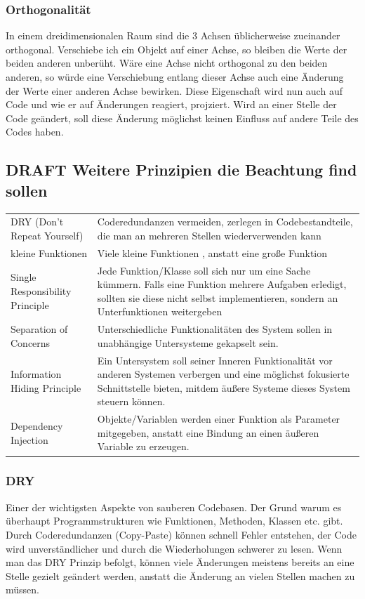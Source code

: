 \documentclass[11pt]{article}
\begin{document}
\subsubsection{Orthogonalität}
\label{sec:orgheadline5}
In einem dreidimensionalen Raum sind die 3 Achsen üblicherweise zueinander
orthogonal. Verschiebe ich ein Objekt auf einer Achse, so bleiben die Werte der
beiden anderen unberüht. Wäre eine Achse nicht orthogonal zu den beiden anderen,
so würde eine Verschiebung entlang dieser Achse auch eine Änderung der Werte
einer anderen Achse bewirken. Diese Eigenschaft wird nun auch auf Code und wie
er auf Änderungen reagiert, projziert. 
Wird an einer Stelle der Code geändert, soll diese Änderung möglichst keinen Einfluss auf
andere Teile des Codes haben.


\subsection{{\bfseries\sffamily DRAFT} Weitere Prinzipien die Beachtung find sollen}
\label{sec:orgheadline13}

\begin{center}
\begin{tabular}{ll}
DRY  (Don't Repeat Yourself) & Coderedundanzen vermeiden, zerlegen in Codebestandteile, die man an mehreren Stellen wiederverwenden kann\\
kleine Funktionen & Viele kleine Funktionen , anstatt eine große Funktion\\
Single Responsibility Principle & Jede Funktion/Klasse soll sich nur um eine Sache kümmern. Falls eine Funktion mehrere Aufgaben erledigt, sollten sie diese nicht selbst implementieren, sondern an Unterfunktionen weitergeben\\
Separation of Concerns & Unterschiedliche Funktionalitäten des System sollen in unabhängige Untersysteme gekapselt sein.\\
Information Hiding Principle & Ein Untersystem soll seiner Inneren Funktionalität vor anderen Systemen verbergen und eine möglichst fokusierte Schnittstelle bieten, mitdem äußere Systeme dieses System steuern können.\\
Dependency Injection & Objekte/Variablen werden einer Funktion als Parameter mitgegeben, anstatt eine Bindung an einen äußeren Variable zu erzeugen.\\
\end{tabular}
\end{center}

\subsubsection{DRY}
\label{sec:orgheadline7}
Einer der wichtigsten Aspekte von sauberen Codebasen. Der Grund warum es
überhaupt Programmstrukturen wie Funktionen, Methoden, Klassen etc. gibt.
Durch Coderedundanzen (Copy-Paste) können schnell Fehler entstehen, der Code
wird unverständlicher und durch die Wiederholungen schwerer zu lesen.
Wenn man das DRY Prinzip befolgt, können viele Änderungen meistens bereits an
eine Stelle gezielt geändert werden, anstatt die Änderung an vielen Stellen
machen zu müssen.
\end{document}
